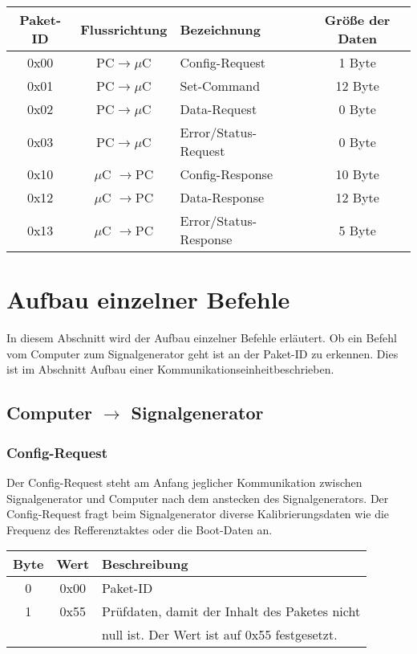 \documentclass[a4paper,12pt]{article}
\begin{document}
\begin{tabular}{c||c|l|c}
Paket-ID & Flussrichtung & Bezeichnung & Größe der Daten \\ 
\hline 
\hline
0x00 & PC$\rightarrow \mu$C & Config-Request & 1 Byte \\ 
\hline 
0x01 & PC$\rightarrow \mu$C & Set-Command & 12 Byte \\ 
\hline 
0x02 & PC$\rightarrow \mu$C & Data-Request & 0 Byte \\ 
\hline 
0x03 & PC$\rightarrow \mu$C & Error/Status-Request & 0 Byte \\ 
\hline 
0x10 & $\mu$C $\rightarrow$PC & Config-Response & 10 Byte \\  
\hline 
0x12 & $\mu$C $\rightarrow$PC & Data-Response & 12 Byte \\ 
\hline
0x13 & $\mu$C $\rightarrow$PC & Error/Status-Response & 5 Byte \\ 
\end{tabular}

\section{Aufbau einzelner Befehle}
In diesem Abschnitt wird der Aufbau einzelner Befehle erläutert. Ob ein Befehl vom Computer zum Signalgenerator geht ist an der Paket-ID zu erkennen. Dies ist im Abschnitt \glqq Aufbau einer Kommunikationseinheit\grqq beschrieben.

\pagebreak
\subsection{Computer $\rightarrow$ Signalgenerator}

\subsubsection{Config-Request}
Der Config-Request steht am Anfang jeglicher Kommunikation zwischen Signalgenerator und Computer nach dem anstecken des Signalgenerators. Der Config-Request fragt beim Signalgenerator diverse Kalibrierungsdaten wie die Frequenz des Refferenztaktes oder die Boot-Daten an.

\begin{flushleft}
\begin{tabular}{c||c|l}
Byte & Wert & Beschreibung \\
\hline
\hline
0 & 0x00 & Paket-ID \\
\hline
1 & 0x55 & Prüfdaten, damit der Inhalt des Paketes nicht \\
& & null ist. Der Wert ist auf 0x55 festgesetzt.\\
\end{tabular}
\end{flushleft}
\end{document}
